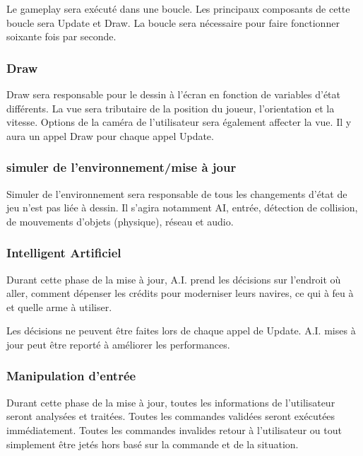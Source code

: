 Le gameplay sera exécuté dans une boucle. Les principaux composants de cette boucle sera Update et Draw. La boucle sera nécessaire pour faire fonctionner soixante fois par seconde.

\subsubsection{Draw} %
\label{ssub:draw}
Draw sera responsable pour le dessin à l'écran en fonction de variables d'état différents. La vue sera tributaire de la position du joueur, l'orientation et la vitesse. Options de la caméra de l'utilisateur sera également affecter la vue. Il y aura un appel Draw pour chaque appel Update.

\subsubsection{simuler de l'environnement/mise à jour} %
\label{ssub:subsubsection_name}

Simuler de l'environnement sera responsable de tous les changements d'état de jeu n'est pas liée à dessin. Il s'agira notamment AI, entrée, détection de collision, de mouvements d'objets (physique), réseau et audio.



\subsubsection{Intelligent Artificiel } %
\label{ssub:a_i_décisions_}
Durant cette phase de la mise à jour, A.I. prend les décisions sur l'endroit où aller, comment dépenser les crédits pour moderniser leurs navires, ce qui à feu à et quelle arme à utiliser. 

Les décisions ne peuvent être faites lors de chaque appel de Update. A.I. mises à jour peut être reporté à améliorer les performances.


\subsubsection{Manipulation d'entrée} %
\label{ssub:manipulation_d_entrée}

Durant cette phase de la mise à jour, toutes les informations de l'utilisateur seront analysées et traitées. Toutes les commandes validées seront exécutées immédiatement. Toutes les commandes invalides retour à l'utilisateur ou tout simplement être jetés hors basé sur la commande et de la situation. 

